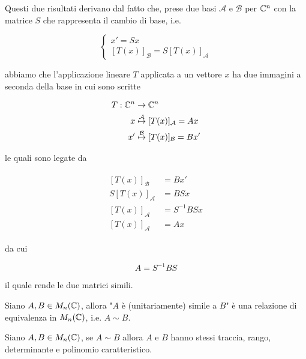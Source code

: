 Questi due risultati derivano dal fatto che, prese due basi $ \mathcal{A} $ e $ \mathcal{B} $ per $ \mathbb{C}^{n} $ con la matrice $ S $ che rappresenta il cambio di base, i.e.

\begin{equation}
	\begin{cases}
		x' = S x\\
		[T(x)]_{\mathcal{B}} = S [T(x)]_{\mathcal{A}}
	\end{cases}
\end{equation}

abbiamo che l'applicazione lineare $ T $ applicata a un vettore $ x $ ha due immagini a seconda della base in cui sono scritte

\begin{align}
	\begin{split}
		T : \mathbb{C}^{n} &\to \mathbb{C}^{n} \\
		x &\stackrel{\mathcal{A}}{\mapsto} [T(x)]_{\mathcal{A}} = A x \\
		x' &\stackrel{\mathcal{B}}{\mapsto} [T(x)]_{\mathcal{B}} = B x'
	\end{split}
\end{align}

le quali sono legate da

\begin{align}
	\begin{split}
		[T(x)]_{\mathcal{B}} &= B x' \\
		S [T(x)]_{\mathcal{A}} &= B S x \\
		[T(x)]_{\mathcal{A}} &= S^{-1} B S x \\
		[T(x)]_{\mathcal{A}} &= A x
	\end{split}
\end{align}

da cui

\begin{equation}
	A = S^{-1} B S
\end{equation}

il quale rende le due matrici simili.

\begin{definition}
	Siano $ A,B \in M_{n}(\mathbb{C}) $, allora "$ A $ è (unitariamente) simile a $ B $" è una relazione di equivalenza in $ M_{n}(\mathbb{C}) $, i.e. $ A \sim B $.
\end{definition}

\begin{definition}
	Siano $ A,B \in M_{n}(\mathbb{C}) $, se $ A \sim B $ allora $ A $ e $ B $ hanno stessi traccia, rango, determinante e polinomio caratteristico.
\end{definition}

